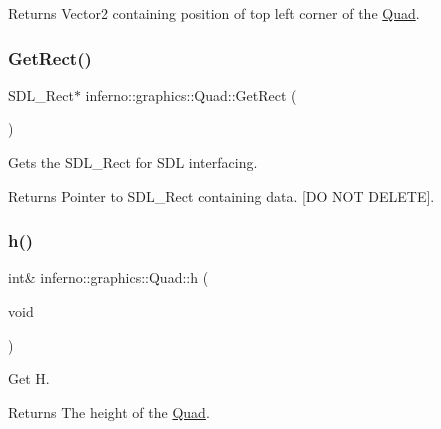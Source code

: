 \begin{DoxyReturn}{Returns}
Vector2 containing position of top left corner of the \mbox{\hyperlink{classinferno_1_1graphics_1_1_quad}{Quad}}. 
\end{DoxyReturn}
\mbox{\label{classinferno_1_1graphics_1_1_quad_a237bc92de4fbd9b77255e56c0e4c15ce}} 
\subsubsection{\texorpdfstring{Get\+Rect()}{GetRect()}}
{\footnotesize\ttfamily S\+D\+L\+\_\+\+Rect$\ast$ inferno\+::graphics\+::\+Quad\+::\+Get\+Rect (\begin{DoxyParamCaption}{ }\end{DoxyParamCaption})\hspace{0.3cm}{\ttfamily [inline]}}



Gets the S\+D\+L\+\_\+\+Rect for S\+DL interfacing. 

\begin{DoxyReturn}{Returns}
Pointer to S\+D\+L\+\_\+\+Rect containing data. \mbox{[}DO N\+OT D\+E\+L\+E\+TE\mbox{]}. 
\end{DoxyReturn}
\mbox{\label{classinferno_1_1graphics_1_1_quad_af5653f4d125b24ac94ab8367e310e541}} 
\subsubsection{\texorpdfstring{h()}{h()}}
{\footnotesize\ttfamily int\& inferno\+::graphics\+::\+Quad\+::h (\begin{DoxyParamCaption}\item[{void}]{ }\end{DoxyParamCaption})\hspace{0.3cm}{\ttfamily [inline]}}



Get H. 

\begin{DoxyReturn}{Returns}
The height of the \mbox{\hyperlink{classinferno_1_1graphics_1_1_quad}{Quad}}. 
\end{DoxyReturn}
\mbox{\label{classinferno_1_1graphics_1_1_quad_ab2956c4435741605c0943d5e6087e690}} 
